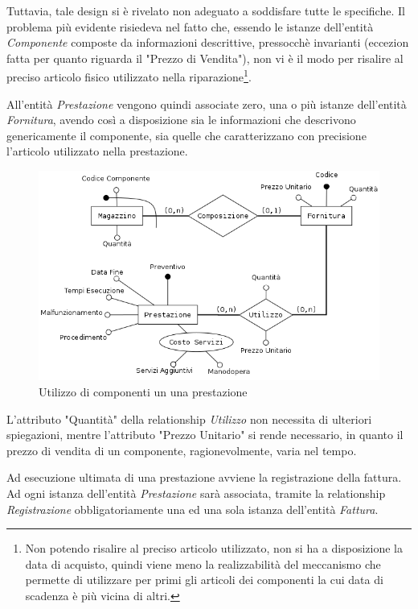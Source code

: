 			Tuttavia, tale design si è rivelato non adeguato a soddisfare tutte le specifiche. Il problema più evidente risiedeva nel fatto che, essendo le istanze dell'entità \emph{Componente} composte da informazioni descrittive, pressocchè invarianti (eccezion fatta per quanto riguarda il "Prezzo di Vendita"), non vi è il modo per risalire al preciso articolo fisico utilizzato nella riparazione\footnote{Non potendo risalire al preciso articolo utilizzato, non si ha a disposizione la data di acquisto, quindi viene meno la realizzabilità del meccanismo che permette di utilizzare per primi gli articoli dei componenti la cui data di scadenza è più vicina di altri.}.
			
			All'entità \emph{Prestazione} vengono quindi associate zero, una o più istanze dell'entità \emph{Fornitura}, avendo così a disposizione sia le informazioni che descrivono genericamente il componente, sia quelle che caratterizzano con precisione l'articolo utilizzato nella prestazione. 

			\begin{figure}
				\centering
				\includegraphics[width=11.5cm]{images/finitures/prestazione_fornitura.png}
				\caption{Utilizzo di componenti un una prestazione}
				\label{fig:ordine_fornitore}
			\end{figure}
			
			L'attributo "Quantità" della relationship \emph{Utilizzo} non necessita di ulteriori spiegazioni, mentre l'attributo "Prezzo Unitario" si rende necessario, in quanto il prezzo di vendita di un componente, ragionevolmente, varia nel tempo.
			
			Ad esecuzione ultimata di una prestazione avviene la registrazione della fattura. Ad ogni istanza dell'entità \emph{Prestazione} sarà associata, tramite la relationship \emph{Registrazione} obbligatoriamente una ed una sola istanza dell'entità \emph{Fattura}. 		
			
